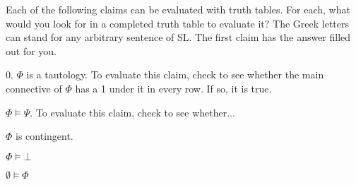 {{%



\iffalse

\practiceproblems



\problempart
\label{HW3.C}
Each of the following claims can be evaluated with truth tables. For each, what would you look for in a completed truth table to evaluate it? The Greek letters can stand for any arbitrary sentence of SL. The first claim has the answer filled out for you.

\begin{earg}
		\item[0.] $\Phi$ is a tautology.
		To evaluate this claim, check to see whether the main connective of $\Phi$ has a 1 under it in every row. If so, it is true.
		\item $\Phi \models \Psi$. 
		To evaluate this claim, check to see whether... 
		
		\item $\Phi$ is contingent.
\item $\Phi \models \bot$
		\item $\emptyset \models \Phi$
	\end{earg}


}}
